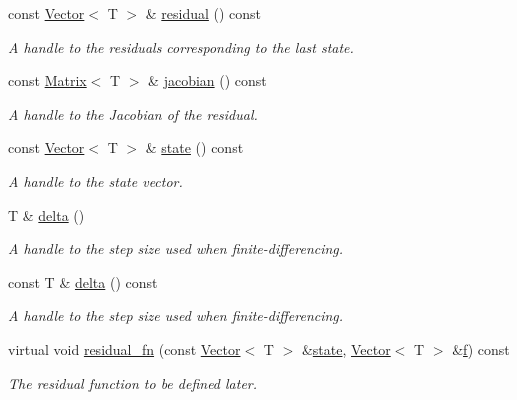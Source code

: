\begin{DoxyCompactItemize}
const \hyperlink{classLuna_1_1Vector}{Vector}$<$ T $>$ \& \hyperlink{classLuna_1_1Residual_a023ed8f4d0a5fa7acca0c982c746b662}{residual} () const
\begin{DoxyCompactList}\small\item\em A handle to the residuals corresponding to the last state. \end{DoxyCompactList}\item 
const \hyperlink{classLuna_1_1Matrix}{Matrix}$<$ T $>$ \& \hyperlink{classLuna_1_1Residual_adffbafa712fc6318f3cd05c03b88decb}{jacobian} () const
\begin{DoxyCompactList}\small\item\em A handle to the Jacobian of the residual. \end{DoxyCompactList}\item 
const \hyperlink{classLuna_1_1Vector}{Vector}$<$ T $>$ \& \hyperlink{classLuna_1_1Residual_a41d9f863aa529f16c5d78fb19b4906bd}{state} () const
\begin{DoxyCompactList}\small\item\em A handle to the state vector. \end{DoxyCompactList}\item 
T \& \hyperlink{classLuna_1_1Residual_a77c3f160a7683b9c960e5b3192107ae9}{delta} ()
\begin{DoxyCompactList}\small\item\em A handle to the step size used when finite-\/differencing. \end{DoxyCompactList}\item 
const T \& \hyperlink{classLuna_1_1Residual_a61c46d8d03274f949b2ac0832c30bde4}{delta} () const
\begin{DoxyCompactList}\small\item\em A handle to the step size used when finite-\/differencing. \end{DoxyCompactList}\item 
virtual void \hyperlink{classLuna_1_1Residual_ae1b1ebe3314c788b176bcac7b328de5c}{residual\+\_\+fn} (const \hyperlink{classLuna_1_1Vector}{Vector}$<$ T $>$ \&\hyperlink{classLuna_1_1Residual_a41d9f863aa529f16c5d78fb19b4906bd}{state}, \hyperlink{classLuna_1_1Vector}{Vector}$<$ T $>$ \&\hyperlink{Nonlinear__ODE__BVP_8cpp_a06fc87d81c62e9abb8790b6e5713c55ba7ce756344023b99e5ab27b804feb765c}{f}) const
\begin{DoxyCompactList}\small\item\em The residual function to be defined later. \end{DoxyCompactList}\end{DoxyCompactItemize}
